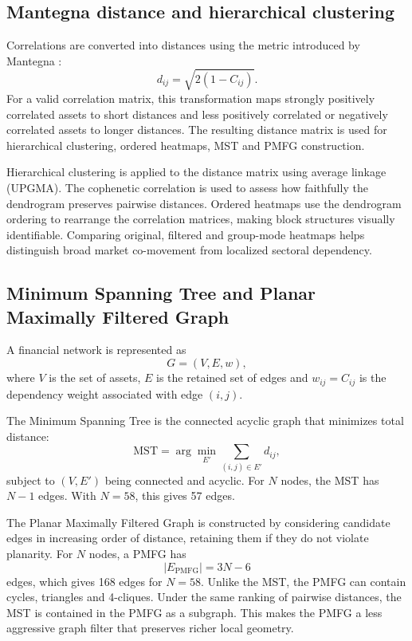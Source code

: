 \subsection{Mantegna distance and hierarchical clustering}
\label{subsec:distance_clustering_method}

Correlations are converted into distances using the metric introduced by Mantegna \cite{mantegna_1999_hierarchical}:
\begin{equation}
d_{ij}
=
\sqrt{2(1-C_{ij})}.
\end{equation}
For a valid correlation matrix, this transformation maps strongly positively correlated assets to short distances and less positively correlated or negatively correlated assets to longer distances. The resulting distance matrix is used for hierarchical clustering, ordered heatmaps, MST and PMFG construction.

Hierarchical clustering is applied to the distance matrix using average linkage (UPGMA). The cophenetic correlation \cite{sokal_rohlf_1962} is used to assess how faithfully the dendrogram preserves pairwise distances. Ordered heatmaps use the dendrogram ordering to rearrange the correlation matrices, making block structures visually identifiable. Comparing original, filtered and group-mode heatmaps helps distinguish broad market co-movement from localized sectoral dependency.

\subsection{Minimum Spanning Tree and Planar Maximally Filtered Graph}
\label{subsec:network_method}

A financial network is represented as
\begin{equation}
G=(V,E,w),
\end{equation}
where $V$ is the set of assets, $E$ is the retained set of edges and $w_{ij}=C_{ij}$ is the dependency weight associated with edge $(i,j)$.

The Minimum Spanning Tree is the connected acyclic graph that minimizes total distance:
\begin{equation}
\mathrm{MST}
=
\arg\min_{E'}
\sum_{(i,j)\in E'}
d_{ij},
\end{equation}
subject to $(V,E')$ being connected and acyclic. For $N$ nodes, the MST has $N-1$ edges. With $N=58$, this gives 57 edges.

The Planar Maximally Filtered Graph is constructed by considering candidate edges in increasing order of distance, retaining them if they do not violate planarity. For $N$ nodes, a PMFG has
\begin{equation}
|E_{\mathrm{PMFG}}|
=
3N-6
\end{equation}
edges, which gives 168 edges for $N=58$. Unlike the MST, the PMFG can contain cycles, triangles and 4-cliques. Under the same ranking of pairwise distances, the MST is contained in the PMFG as a subgraph. This makes the PMFG a less aggressive graph filter that preserves richer local geometry.

